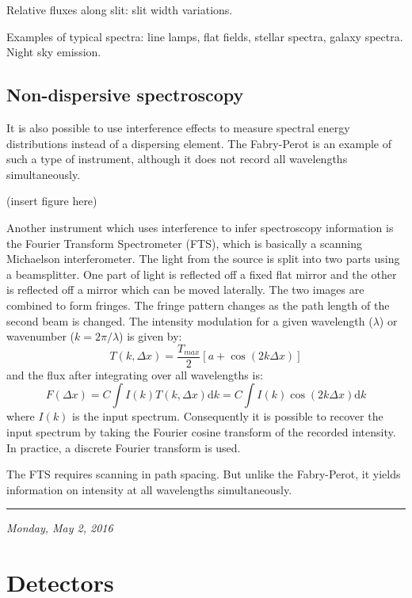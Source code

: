 \documentclass[12pt]{article}
\newcommand{\mydate}[1]{
    \rule{\textwidth}{0.4pt}

    {\vspace{-1ex}\small\hfill\textit{#1}}}
\begin{document}
Relative fluxes along slit: slit width variations.

Examples of typical spectra: line lamps, flat fields, stellar spectra,
galaxy spectra. Night sky emission.

\subsection{Non-dispersive spectroscopy}

It is also possible to use interference effects to measure spectral
energy distributions instead of a dispersing element. The Fabry-Perot
is an example of such a type of instrument, although it does not
record all wavelengths simultaneously.

(insert figure here)

Another instrument which uses interference to infer spectroscopy
information is the Fourier Transform Spectrometer (FTS), which is
basically a scanning Michaelson interferometer. The light from the
source is split into two parts using a beamsplitter. One part of light
is reflected off a fixed flat mirror and the other is reflected off a
mirror which can be moved laterally. The two images are combined to
form fringes. The fringe pattern changes as the path length of the
second beam is changed. The intensity modulation for a given
wavelength ($\lambda$) or wavenumber ($k = 2\pi/\lambda$) is
given by:{$$
    T\left(k,\Delta{x}\right) = \frac{T_{max}}{2}
    \left[a + \cos\left(2k\Delta{x}\right)\right]
$$}and the flux after integrating over all wavelengths is:{$$
    F\left(\Delta{x}\right) =
    C\int{I(k)T(k,\Delta{x})\textrm{d}k} =
    C\int{I(k)\cos(2k\Delta{x})\textrm{d}k}
$$}where $I(k)$ is the input spectrum. Consequently it is possible to
recover the input spectrum by taking the Fourier cosine transform of
the recorded intensity. In practice, a discrete Fourier transform is
used.

The FTS requires scanning in path spacing. But unlike the Fabry-Perot,
it yields information on intensity at all wavelengths simultaneously.

\newpage
\mydate{Monday, May 2, 2016}
\section{Detectors}
\end{document}
